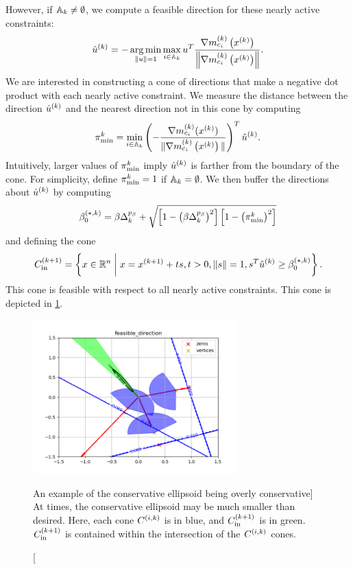 However, if ${\mathbb A_{k}} \ne \emptyset$, we compute a feasible direction for these nearly active constraints:
\begin{align}
{{\hat u}^{(k)}} = -\operatorname*{arg\,min}_{\|u\| = 1} \max_{i \in {\mathbb A_{k}}} u^T \frac{{\nabla m_{c_i}^{(k)}\left(x^{(k)}\right)}}{\left\|{\nabla m_{c_i}^{(k)}\left(x^{(k)}\right)}\right\|}. \label{define_u}
\end{align}
We are interested in constructing a cone of directions that make a negative dot product with each nearly active constraint.
We measure the distance between the direction ${{\hat u}^{(k)}}$ and the nearest direction not in this cone by computing
\begin{align}
{\pi^k_{\textrm{min}}} = \min_{i \in {\mathbb A_{k}}} \left(-{\frac{\nabla m^{(k)}_{c_i}(x^{(k)})}{\|\nabla m^{(k)}_{c_i}\left(x^{(k)}\right)\|}}\right)^T {{\hat u}^{(k)}} \label{define_thetamink}.
\end{align}
Intuitively, larger values of ${\pi^k_{\textrm{min}}}$ imply ${{\hat u}^{(k)}}$ is farther from the boundary of the cone.
For simplicity, define ${\pi^k_{\textrm{min}}} = 1$ if ${\mathbb A_{k}} = \emptyset$.
We then buffer the directions about ${{\hat u}^{(k)}}$ by computing
\begin{align}
{\beta_0^{(\star, k)}} = \beta\Delta_k^{p_{\beta}} + \sqrt{\left[1 - \left(\beta\Delta_k^{p_{\beta}}\right)^2\right]\left[1 - \left({\pi^k_{\textrm{min}}}\right) ^2\right]} \label{define_bsk}
\end{align}
and defining the cone
\begin{align}
{C^{(k+1)}_{\textrm{in}}} = \left\{x \in \mathbb R^n \; \bigg| \; x = {{x}^{(k+1)}} + ts, t > 0, \|s\| = 1, s^T{{\hat u}^{(k)}} \ge {\beta_0^{(\star, k)}} \right\}. \label{define_inner_cone}
\end{align}
This cone is feasible with respect to all nearly active constraints.
This cone is depicted in \cref{feasible_direction}.
\begin{figure}[ht]
    \centering
    \includegraphics[width=300px]{images/feasible_direction.png}
    \caption
    	[An example of the conservative ellipsoid being overly conservative]
    	{
    		At times, the conservative ellipsoid may be much smaller than desired.
    		Here, each cone ${C^{(i, k)}}$ is in blue, and ${C^{(k+1)}_{\textrm{in}}}$ is in green.
    		${C^{(k+1)}_{\textrm{in}}}$ is contained within the intersection of the ${C^{(i, k)}}$ cones.
	}
    \label{feasible_direction}
\end{figure}


